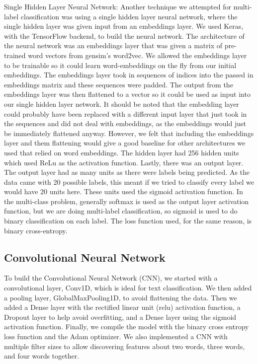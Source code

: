 \documentclass[sigconf]{acmart}
\begin{document}
Single Hidden Layer Neural Network:
Another technique we attempted for multi-label classification was using a single hidden layer neural network, where the single hidden layer was given input from an embeddings layer. We used Keras, with the TensorFlow backend, to build the neural network.  The architecture of the neural network was an embeddings layer that was given a matrix of pre-trained word vectors from gensim's word2vec.  We allowed the embeddings layer to be trainable so it could learn word-embeddings on the fly from our initial embeddings. The embeddings layer took in sequences of indices into the passed in embeddings matrix and these sequences were padded. The output from the embeddings layer was then flattened to a vector so it could be used as input into our single hidden layer network. It should be noted that the embedding layer could probably have been replaced with a different input layer that just took in the sequences and did not deal with embeddings, as the embeddings would just be immediately flattened anyway.  However, we felt that including the embeddings layer and them flattening would give a good baseline for other architectures we used that relied on word embeddings.  The hidden layer had 256 hidden units which used ReLu as the activation function.  Lastly, there was an output layer.  The output layer had as many units as there were labels being predicted. As the data came with 20 possible labels, this meant if we tried to classify every label we would have 20 units here.  These units used the sigmoid activation function. In the multi-class problem, generally softmax is used as the output layer activation function, but we are doing multi-label classification, so sigmoid is used to do binary classification on each label.  The loss function used, for the same reason, is binary cross-entropy. 

\subsection{Convolutional Neural Network}
To build the Convolutional Neural Network (CNN), we started with a convolutional layer, Conv1D, which is ideal for text classification. We then added a pooling layer, GlobalMaxPooling1D, to avoid flattening the data. Then we added a Dense layer with the rectified linear unit (relu) activation function, a Dropout layer to help avoid overfitting, and a Dense layer using the sigmoid activation function. Finally, we compile the model with the binary cross entropy loss function and the Adam optimizer. We also implemented a CNN with multiple filter sizes to allow discovering features about two words, three words, and four words together. 
\end{document}
